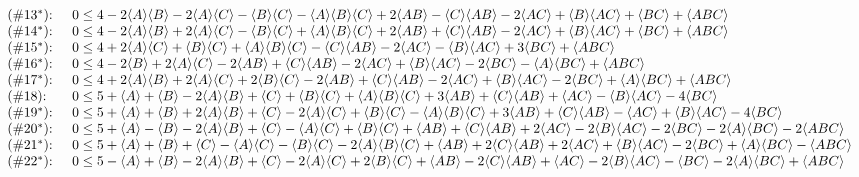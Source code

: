 {\begin{align*}
{\begin{array}{ll}
 \text{($\#$} 13^* \text{):  } & 0\leq 4-2 \langle A\rangle \langle B\rangle-2 \langle A\rangle \langle C\rangle-\langle B\rangle \langle C\rangle-\langle A\rangle \langle B\rangle
   \langle C\rangle+2 \langle AB\rangle-\langle C\rangle \langle AB\rangle-2 \langle AC\rangle+\langle B\rangle \langle AC\rangle+\langle BC\rangle+\langle ABC\rangle \\
 \text{($\#$} 14^* \text{):  } & 0\leq 4-2 \langle A\rangle \langle B\rangle+2 \langle A\rangle \langle C\rangle-\langle B\rangle \langle C\rangle+\langle A\rangle \langle B\rangle
   \langle C\rangle+2 \langle AB\rangle+\langle C\rangle \langle AB\rangle-2 \langle AC\rangle+\langle B\rangle \langle AC\rangle+\langle BC\rangle+\langle ABC\rangle \\
 \text{($\#$} 15^* \text{):  } & 0\leq 4+2 \langle A\rangle \langle C\rangle+\langle B\rangle \langle C\rangle+\langle A\rangle \langle B\rangle \langle C\rangle-\langle C\rangle \langle AB\rangle-2
   \langle AC\rangle-\langle B\rangle \langle AC\rangle+3 \langle BC\rangle+\langle ABC\rangle \\
 \text{($\#$} 16^* \text{):  } & 0\leq 4-2 \langle B\rangle+2 \langle A\rangle \langle C\rangle-2 \langle AB\rangle+\langle C\rangle \langle AB\rangle-2 \langle AC\rangle+\langle B\rangle
   \langle AC\rangle-2 \langle BC\rangle-\langle A\rangle \langle BC\rangle+\langle ABC\rangle \\
 \text{($\#$} 17^* \text{):  } & 0\leq 4+2 \langle A\rangle \langle B\rangle+2 \langle A\rangle \langle C\rangle+2 \langle B\rangle \langle C\rangle-2 \langle AB\rangle+\langle C\rangle
   \langle AB\rangle-2 \langle AC\rangle+\langle B\rangle \langle AC\rangle-2 \langle BC\rangle+\langle A\rangle \langle BC\rangle+\langle ABC\rangle \\
 \text{($\#$} 18 \text{):  } & 0\leq 5+\langle A\rangle+\langle B\rangle-2 \langle A\rangle \langle B\rangle+\langle C\rangle+\langle B\rangle \langle C\rangle+\langle A\rangle \langle B\rangle
   \langle C\rangle+3 \langle AB\rangle+\langle C\rangle \langle AB\rangle+\langle AC\rangle-\langle B\rangle \langle AC\rangle-4 \langle BC\rangle \\
 \text{($\#$} 19^* \text{):  } & 0\leq 5+\langle A\rangle+\langle B\rangle+2 \langle A\rangle \langle B\rangle+\langle C\rangle-2 \langle A\rangle \langle C\rangle+\langle B\rangle
   \langle C\rangle-\langle A\rangle \langle B\rangle \langle C\rangle+3 \langle AB\rangle+\langle C\rangle \langle AB\rangle-\langle AC\rangle+\langle B\rangle \langle AC\rangle-4 \langle BC\rangle \\
 \text{($\#$} 20^* \text{):  } & 0\leq 5+\langle A\rangle-\langle B\rangle-2 \langle A\rangle \langle B\rangle+\langle C\rangle-\langle A\rangle \langle C\rangle+\langle B\rangle
   \langle C\rangle+\langle AB\rangle+\langle C\rangle \langle AB\rangle+2 \langle AC\rangle-2 \langle B\rangle \langle AC\rangle-2 \langle BC\rangle-2 \langle A\rangle \langle BC\rangle-2 \langle ABC\rangle \\
 \text{($\#$} 21^* \text{):  } & 0\leq 5+\langle A\rangle+\langle B\rangle+\langle C\rangle-\langle A\rangle \langle C\rangle-\langle B\rangle \langle C\rangle-2 \langle A\rangle \langle B\rangle
   \langle C\rangle+\langle AB\rangle+2 \langle C\rangle \langle AB\rangle+2 \langle AC\rangle+\langle B\rangle \langle AC\rangle-2 \langle BC\rangle+\langle A\rangle \langle BC\rangle-\langle ABC\rangle \\
 \text{($\#$} 22^* \text{):  } & 0\leq 5-\langle A\rangle+\langle B\rangle-2 \langle A\rangle \langle B\rangle+\langle C\rangle-2 \langle A\rangle \langle C\rangle+2 \langle B\rangle
   \langle C\rangle+\langle AB\rangle-2 \langle C\rangle \langle AB\rangle+\langle AC\rangle-2 \langle B\rangle \langle AC\rangle-\langle BC\rangle-2 \langle A\rangle \langle BC\rangle+\langle ABC\rangle \\

\end{array}}
\end{align*}}
